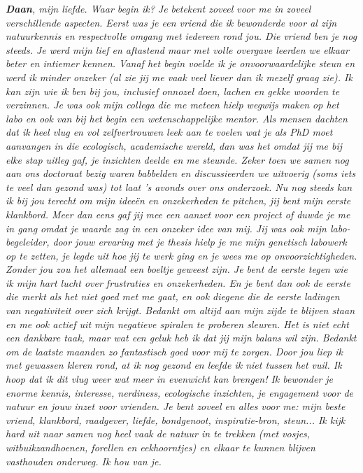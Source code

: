 \documentclass[10pt, twoside]{book} %
\begin{document}
\begin{small}
\textit{\textbf{Daan}, mijn liefde. Waar begin ik? Je betekent zoveel voor me in zoveel verschillende aspecten. Eerst was je een vriend die ik bewonderde voor al zijn natuurkennis en respectvolle omgang met iedereen rond jou. Die vriend ben je nog steeds. Je werd mijn lief en aftastend maar met volle overgave leerden we elkaar beter en intiemer kennen. Vanaf het begin voelde ik je onvoorwaardelijke steun en werd ik minder onzeker (al zie jij me vaak veel liever dan ik mezelf graag zie). Ik kan zijn wie ik ben bij jou, inclusief onnozel doen, lachen en gekke woorden te verzinnen. Je was ook mijn collega die me meteen hielp wegwijs maken op het labo en ook van bij het begin een wetenschappelijke mentor. Als mensen dachten dat ik heel vlug en vol zelfvertrouwen leek aan te voelen wat je als PhD moet aanvangen in die ecologisch, academische wereld, dan was het omdat jij me bij elke stap uitleg gaf, je inzichten deelde en me steunde. Zeker toen we samen nog aan ons doctoraat bezig waren babbelden en discussieerden we uitvoerig (soms iets te veel dan gezond was) tot laat 's avonds over ons onderzoek. Nu nog steeds kan ik bij jou terecht om mijn ideeën en onzekerheden te pitchen, jij bent mijn eerste klankbord. Meer dan eens gaf jij mee een aanzet voor een project of duwde je me in gang omdat je waarde zag in een onzeker idee van mij. Jij was ook mijn labo-begeleider, door jouw ervaring met je thesis hielp je me mijn genetisch labowerk op te zetten, je legde uit hoe jij te werk ging en je wees me op onvoorzichtigheden. Zonder jou zou het allemaal een boeltje geweest zijn. Je bent de eerste tegen wie ik mijn hart lucht over frustraties en onzekerheden. En je bent dan ook de eerste die merkt als het niet goed met me gaat, en ook diegene die de eerste ladingen van negativiteit over zich krijgt. Bedankt om altijd aan mijn zijde te blijven staan en me ook actief uit mijn negatieve spiralen te proberen sleuren. Het is niet echt een dankbare taak, maar wat een geluk heb ik dat jij mijn balans wil zijn. Bedankt om de laatste maanden zo fantastisch goed voor mij te zorgen. Door jou liep ik met gewassen kleren rond, at ik nog gezond en leefde ik niet tussen het vuil. Ik hoop dat ik dit vlug weer wat meer in evenwicht kan brengen! Ik bewonder je enorme kennis, interesse, nerdiness, ecologische inzichten, je engagement voor de natuur en jouw inzet voor vrienden. Je bent zoveel en alles voor me: mijn beste vriend, klankbord, raadgever, liefde, bondgenoot, inspiratie-bron, steun... Ik kijk hard uit naar samen nog heel vaak de natuur in te trekken (met vosjes, witbuikzandhoenen, forellen en eekhoorntjes) en elkaar te kunnen blijven vasthouden onderweg. Ik hou van je.}

\end{small}
\end{document}
